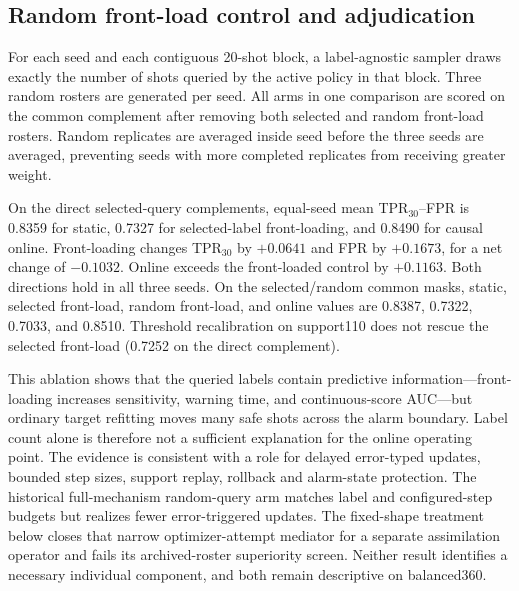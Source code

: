 \documentclass[10pt]{article}
\begin{document}
\subsection{Random front-load control and adjudication}

For each seed and each contiguous 20-shot block, a label-agnostic sampler draws exactly the number of shots queried by the active policy in that block.  Three random rosters are generated per seed.  All arms in one comparison are scored on the common complement after removing both selected and random front-load rosters.  Random replicates are averaged inside seed before the three seeds are averaged, preventing seeds with more completed replicates from receiving greater weight.

On the direct selected-query complements, equal-seed mean TPR$_{30}$--FPR is 0.8359 for static, 0.7327 for selected-label front-loading, and 0.8490 for causal online.  Front-loading changes TPR$_{30}$ by $+0.0641$ and FPR by $+0.1673$, for a net change of $-0.1032$.  Online exceeds the front-loaded control by $+0.1163$.  Both directions hold in all three seeds.  On the selected/random common masks, static, selected front-load, random front-load, and online values are 0.8387, 0.7322, 0.7033, and 0.8510.  Threshold recalibration on support110 does not rescue the selected front-load (0.7252 on the direct complement).

This ablation shows that the queried labels contain predictive information---front-loading increases sensitivity, warning time, and continuous-score AUC---but ordinary target refitting moves many safe shots across the alarm boundary.  Label count alone is therefore not a sufficient explanation for the online operating point.  The evidence is consistent with a role for delayed error-typed updates, bounded step sizes, support replay, rollback and alarm-state protection.  The historical full-mechanism random-query arm matches label and configured-step budgets but realizes fewer error-triggered updates.  The fixed-shape treatment below closes that narrow optimizer-attempt mediator for a separate assimilation operator and fails its archived-roster superiority screen.  Neither result identifies a necessary individual component, and both remain descriptive on balanced360.

\begin{table}[h]
\centering
\small

\caption{Causal active-versus-random query replay. Random schedules match the active per-block label count, parent, runner and configured step budget. Inter attempts are realized shared-update attempts and reveal the remaining compute mediator.}
\end{table}
\end{document}
